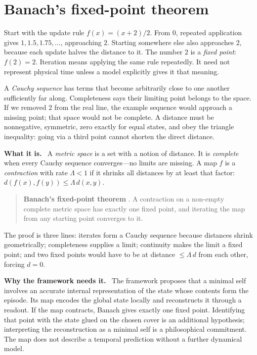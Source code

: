 \documentclass[11pt]{article}
\newcommand{\what}{\par\smallskip\noindent\textbf{What it is.}\ }
\newcommand{\why}{\par\smallskip\noindent\textbf{Why the framework needs it.}\ }
\begin{document}
\section{Banach's fixed-point theorem}

Start with the update rule $f(x)=(x+2)/2$. From $0$, repeated application gives
$1,1.5,1.75,\ldots$, approaching $2$. Starting somewhere else also approaches
$2$, because each update halves the distance to it. The number $2$ is a
\emph{fixed point}: $f(2)=2$. Iteration means applying the same rule repeatedly.
It need not represent physical time unless a model explicitly gives it that
meaning.

A \emph{Cauchy sequence} has terms that become arbitrarily close to one
another sufficiently far along. Completeness says their limiting point belongs
to the space. If we removed $2$ from the real line, the example sequence would
approach a missing point; that space would not be complete. A distance must
be nonnegative, symmetric, zero exactly for equal states, and obey the triangle
inequality: going via a third point cannot shorten the direct distance.

\what
A \emph{metric space} is a set with a notion of distance. It is
\emph{complete} when every Cauchy sequence converges---no limits are missing.
A map $f$ is a \emph{contraction} with rate $\Lambda<1$ if it shrinks all
distances by at least that factor:
$d(f(x),f(y))\le\Lambda\,d(x,y)$.

\begin{quote}
\textbf{Banach's fixed-point theorem} \citep{banach1922}. A contraction on a
non-empty complete metric space has exactly one fixed point, and iterating the
map from any starting point converges to it.
\end{quote}

\noindent
The proof is three lines: iterates form a Cauchy sequence because distances
shrink geometrically; completeness supplies a limit; continuity makes the limit
a fixed point; and two fixed points would have to be at distance
$\le\Lambda\,d$ from each other, forcing $d=0$.

\why
The framework proposes that a minimal self involves an accurate internal
representation of the state whose contents form the episode. Its map encodes
the global state locally and reconstructs it through a readout. If the map
contracts, Banach gives exactly one fixed point. Identifying that point with
the state glued on the chosen cover is an additional hypothesis; interpreting
the reconstruction as a minimal self is a philosophical commitment. The map
does not describe a temporal prediction without a further dynamical model.
\end{document}
